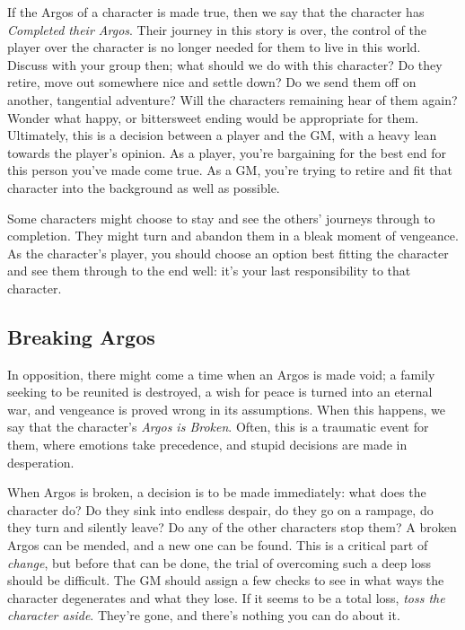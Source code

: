 \documentclass[../main.tex]{subfiles}
\begin{document}
        If the Argos of a character is made true, then we say that the character has \emph{Completed their Argos}. Their journey in this story is over, the control of the player over the character is no longer needed for them to live in this world. Discuss with your group then; what should we do with this character? Do they retire, move out somewhere nice and settle down? Do we send them off on another, tangential adventure? Will the characters remaining hear of them again? Wonder what happy, or bittersweet ending would be appropriate for them. Ultimately, this is a decision between a player and the GM, with a heavy lean towards the player's opinion. As a player, you're bargaining for the best end for this person you've made come true. As a GM, you're trying to retire and fit that character into the background as well as possible.

        Some characters might choose to stay and see the others' journeys through to completion. They might turn and abandon them in a bleak moment of vengeance. As the character's player, you should choose an option best fitting the character and see them through to the end well: it's your last responsibility to that character.

    \subsection{Breaking Argos}

        In opposition, there might come a time when an Argos is made void; a family seeking to be reunited is destroyed, a wish for peace is turned into an eternal war, and vengeance is proved wrong in its assumptions. When this happens, we say that the character's \emph{Argos is Broken}. Often, this is a traumatic event for them, where emotions take precedence, and stupid decisions are made in desperation.

        When Argos is broken, a decision is to be made immediately: what does the character do? Do they sink into endless despair, do they go on a rampage, do they turn and silently leave? Do any of the other characters stop them? A broken Argos can be mended, and a new one can be found. This is a critical part of \emph{change}, but before that can be done, the trial of overcoming such a deep loss should be difficult. The GM should assign a few checks to see in what ways the character degenerates and what they lose. If it seems to be a total loss, \emph{toss the character aside}. They're gone, and there's nothing you can do about it.
\end{document}
